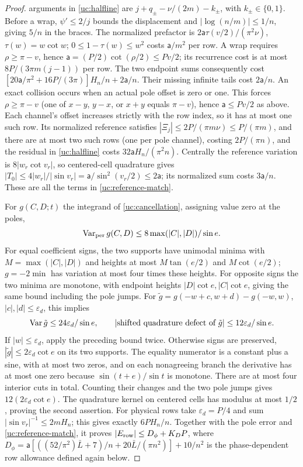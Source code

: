 \begin{proof}
arguments in \eqref{uc:halfline} are
$j+q_\pm-\nu/(2m)-k_\pm$, with $k_\pm\in\{0,1\}$.
Before a wrap, $\psi'\leq2/j$ bounds the displacement and
$|\log(n/m)|\leq1/n$, giving $5/n$ in the braces.
The normalized prefactor is
$2\mathsf{a}\tau(v/2)/(\pi^2\nu)$, $\tau(w)=w\cot w$;
$0\leq1-\tau(w)\leq w^2$ costs $\mathsf{a}/m^2$ per row.
A wrap requires $\rho\geq\pi-v$, hence
$\mathsf{a}=(P/2)\cot(\rho/2)\leq Pv/2$; its recurrence cost is at most
$8P/(3\pi m(j-1))$ per row. The two endpoint sums consequently
cost $[20\mathsf{a}/\pi^2+16P/(3\pi)]H_n/n+2\mathsf{a}/n$.
Their missing infinite tails cost $2\mathsf{a}/n$. An exact collision occurs
when an actual pole offset is zero or one. This forces $\rho\geq\pi-v$
(one of $x-y$, $y-x$, or $x+y$ equals $\pi-v$), hence
$\mathsf a\leq Pv/2$ as above. Each channel's offset increases strictly
with the row index, so it has at most one such row. Its normalized reference satisfies
$|\Xi_j|\leq2P/(\pi m\nu)\leq P/(\pi m)$, and there are at most
two such rows (one per pole channel), costing $2P/(\pi n)$, and the residual in \eqref{uc:halfline} costs
$32\mathsf{a}H_n/(\pi^2n)$. Centrally the reference variation is
$8|w_r\cot v_r|$, so centered-cell quadrature gives
$|T_0|\leq4|w_r|/|\sin v_r|=\mathsf{a}/\sin^2(v_r/2)\leq2\mathsf{a}$;
its normalized sum costs $3\mathsf{a}/n$. These are all the terms in
\eqref{uc:reference-match}.

For $g(C,D;t)$ the integrand of \eqref{uc:cancellation}, assigning
value zero at the poles,
\[
 \operatorname{Var}_{\rm per}g(C,D)\leq
       8\max(|C|,|D|)/\sin e.
\]
For equal coefficient signs, the two supports have unimodal minima
with $M=\max(|C|,|D|)$ and heights at most $M\tan(e/2)$ and $M\cot(e/2)$;
$g=-2\min$ has variation at most four times these heights.
For opposite signs the two minima are monotone, with endpoint heights
$|D|\cot e,|C|\cot e$, giving the same bound including the pole jumps.
For $\tilde g=g(-w+c,w+d)-g(-w,w)$, $|c|,|d|\leq\varepsilon_d$, this implies
\begin{equation}\label{uc:ordinary-variation}
 \operatorname{Var}\tilde g\leq24\varepsilon_d/\sin e,
 \qquad |\hbox{shifted quadrature defect of }\tilde g|
                  \leq12\varepsilon_d/\sin e.
\end{equation}
If $|w|\leq\varepsilon_d$, apply the preceding bound twice.
Otherwise signs are preserved, $|\tilde g|\leq2\varepsilon_d\cot e$ on
its two supports. The equality numerator is a constant plus a sine,
with at most two zeros, and on each nonagreeing branch the derivative
has at most one zero because $\sin(t+e)/\sin t$ is monotone.
There are at most four interior cuts in total. Counting their changes
and the two pole jumps gives $12(2\varepsilon_d\cot e)$.
The quadrature kernel on centered cells has modulus at most $1/2$,
proving the second assertion. For physical rows take
$\varepsilon_d=P/4$ and sum $|\sin v_r|^{-1}\leq2mH_n$;
this gives exactly $6PH_n/n$. Together with the pole error and
\eqref{uc:reference-match}, it proves
$|E_{\rm row}|\leq D_\phi+K_DP$, where
$D_\phi=\mathsf a[((52/\pi^2)\bar L+7)/n+20\bar L/(\pi n^2)]+10/n^2$
is the phase-dependent row allowance defined again below.


\end{proof}
